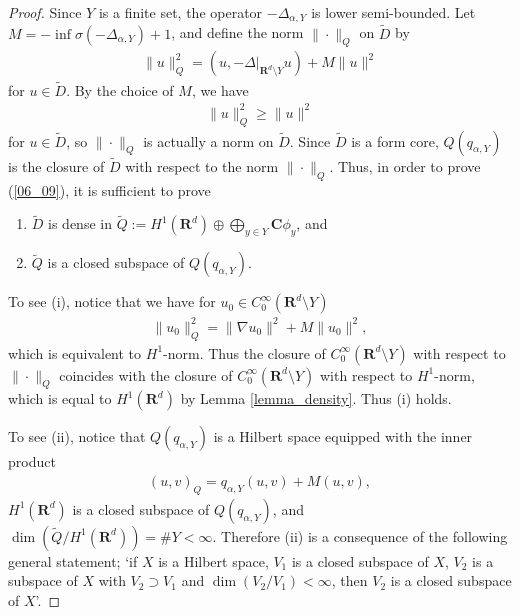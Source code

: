 \documentclass[12pt,a4paper]{article}
\begin{document}
\begin{proof}
Since $Y$ is a finite set,
the operator $-\Delta_{\alpha,Y}$ is lower semi-bounded.
Let $M=-\inf \sigma(-\Delta_{\alpha,Y})+1$,
and define the norm $\|\cdot\|_Q$ on $\widetilde{D}$ by
\begin{align*}
 \|u\|_Q^2=(u,-\Delta|_{\mathbf{R}^d\setminus Y} u)+M\|u\|^2
\end{align*}
for $u\in \widetilde{D}$.
By the choice of $M$, we have
\begin{align*}
 \|u\|_Q^2\geq \|u\|^2
\end{align*}
for $u\in \widetilde{D}$,
so $\|\cdot\|_Q$ is actually a norm on $\widetilde{D}$.
Since $\widetilde{D}$ is a form core,
$Q(q_{\alpha,Y})$ is
the closure of $\widetilde{D}$ with respect to the norm $\|\cdot\|_Q$.
Thus, in order to prove (\ref{06_09}),
it is sufficient to prove
\begin{enumerate}
 \item $\widetilde{D}$ is dense in 
$\widetilde{Q}:=H^1(\mathbf{R}^d)\oplus\bigoplus_{y\in Y}\mathbf{C}\phi_y$,
and
 \item $\widetilde{Q}$ is a closed subspace of $Q(q_{\alpha,Y})$.
\end{enumerate}

To see (i), notice that
we have for $u_0\in C_0^\infty(\mathbf{R}^d\setminus Y)$
\begin{align*}
 \|u_0\|_Q^2
=
\|\nabla u_0\|^2+M\|u_0\|^2,
\end{align*}
which is equivalent to $H^1$-norm.
Thus 
the closure of 
$C_0^\infty(\mathbf{R}^d\setminus Y)$ 
with respect to $\|\cdot\|_Q$
coincides with
the closure of 
$C_0^\infty(\mathbf{R}^d\setminus Y)$ 
with respect to $H^1$-norm,
which is equal to $H^1(\mathbf{R}^d)$ 
by Lemma \ref{lemma_density}.
Thus (i) holds.

To see (ii),
notice that $Q(q_{\alpha,Y})$ is a Hilbert space
equipped with the inner product
\begin{align*}
 (u,v)_Q=q_{\alpha,Y}(u,v)+M(u,v),
\end{align*}
$H^1(\mathbf{R}^d)$ is a closed subspace of $Q(q_{\alpha,Y})$,
and $\dim(\widetilde{Q}/H^1(\mathbf{R}^d))=\#Y<\infty.$
Therefore
(ii) is a consequence of the following general statement;
`if $X$ is a Hilbert space,
$V_1$ is a closed subspace of $X$,
$V_2$ is a subspace of $X$ with $V_2\supset V_1$
and $\dim(V_2/V_1)<\infty$,
then $V_2$ is a closed subspace of $X$'.


\end{proof}
\end{document}
